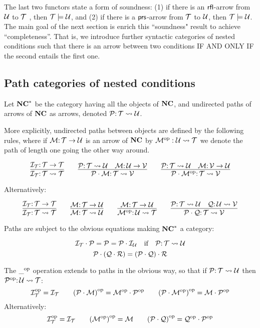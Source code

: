 The last two functors state a form of soundness: (1) if there is an ${\mathsf{rfl}}$-arrow from ${\mathcal{U}}$ to ${\mathcal{T}}$ , then ${\mathcal{T}} \models {\mathcal{U}}$, and (2)  if there is a ${\mathsf{prs}}$-arrow from ${\mathcal{T}}$ to ${\mathcal{U}}$, then ${\mathcal{T}} \models {\mathcal{U}}$. 
The main goal of the next section is enrich this ``soundness" result to achieve ``completeness''. That is, we introduce further syntactic categories of nested conditions such that there is an arrow between two conditions IF AND ONLY IF the second entails the first one.

\subsection{Path categories of nested conditions}

\begin{definition}
    Let $\mathbf{NC}^*$ be the category having all the objects of $\mathbf{NC}$, and undirected paths of arrows of $\mathbf{NC}$ as arrows, denoted ${\mathcal{P}}{:}\, {\mathcal{T}} \leadsto {\mathcal{U}}$. 

    More explicitly, undirected paths between objects are defined by the following rules, where if ${\mathcal{M}}{:}\, {\mathcal{T}} \rightarrow {\mathcal{U}}$ is an arrow of $\mathbf{NC}$ by ${{\mathcal{M}}}^{\mathrm{op}}: {\mathcal{U}} \leadsto {\mathcal{T}}$ we denote the path of length one going the other way around.

    $$ \infer{\cI_\cT\of \cT \leadsto \cT}{\cI_\cT\of \cT \to \cT} \qquad 
    \infer{\cP \cdot \cM \of \cT \leadsto \cV}{\cP\of \cT \leadsto \cU & \cM \of \cU \to \cV} \qquad 
    \infer{\cP \cdot \op{\cM} \of \cT \leadsto \cV}{\cP\of \cT \leadsto \cU & \cM \of \cV \to \cU}$$

    Alternatively:

    $$ \infer{\cI_\cT\of \cT \leadsto \cT}{\cI_\cT\of \cT \to \cT} \qquad 
    \infer{\cM \of \cT \leadsto \cU}{\cM \of \cT \to \cU} \qquad 
    \infer{\op{\cM} \of \cU \leadsto \cT}{\cM \of \cT \to \cU}\qquad
    \infer{\cP \cdot \cQ \of \cT \leadsto \cV}{\cP\of \cT \leadsto \cU & \cQ \of \cU \leadsto \cV}$$

    Paths are subject to the obvious equations making $\mathbf{NC}^*$ a category:

    $$ {\mathcal{I}}_{\mathcal{T}} \cdot {\mathcal{P}} = {\mathcal{P}} = {\mathcal{P}} \cdot {\mathcal{I}}_{\mathcal{U}} \mbox{\quad if\quad} {\mathcal{P}}{:}\, {\mathcal{T}} \leadsto {\mathcal{U}}$$
    $${\mathcal{P}} \cdot ({\mathcal{Q}} \cdot {\mathcal{R}}) = ({\mathcal{P}} \cdot {\mathcal{Q}}) \cdot {\mathcal{R}}$$
    
    The ${\_}^{\mathrm{op}}$ operation extends to paths in the obvious way, so that if ${\mathcal{P}}{:}\, {\mathcal{T}} \leadsto {\mathcal{U}}$ then ${{\mathcal{P}}}^{\mathrm{op}}{:}\, {\mathcal{U}} \leadsto {\mathcal{T}}$:
   $$ {{\mathcal{I}}}^{\mathrm{op}}_{\mathcal{T}} = {\mathcal{I}}_{\mathcal{T}} \qquad {({\mathcal{P}}\cdot {\mathcal{M}})}^{\mathrm{op}} = {{\mathcal{M}}}^{\mathrm{op}}\cdot {{\mathcal{P}}}^{\mathrm{op}} \qquad {({\mathcal{P}}\cdot {{\mathcal{M}}}^{\mathrm{op}})}^{\mathrm{op}} = {\mathcal{M}}\cdot {{\mathcal{P}}}^{\mathrm{op}} $$ 
   Alternatively:
$$ {{\mathcal{I}}}^{\mathrm{op}}_{\mathcal{T}} = {\mathcal{I}}_{\mathcal{T}} \qquad 
{({{\mathcal{M}}}^{\mathrm{op}})}^{\mathrm{op}} = {\mathcal{M}} \qquad {({\mathcal{P}}\cdot {\mathcal{Q}})}^{\mathrm{op}} = {{\mathcal{Q}}}^{\mathrm{op}} \cdot {{\mathcal{P}}}^{\mathrm{op}} $$ 
\end{definition}

